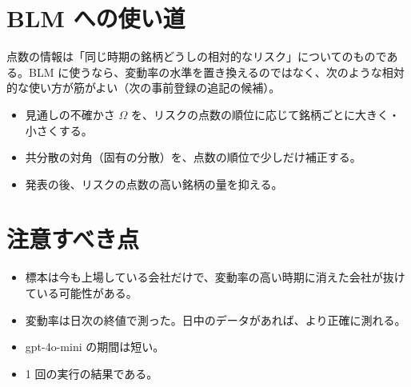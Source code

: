 \section{BLM への使い道}

点数の情報は「同じ時期の銘柄どうしの相対的なリスク」についてのものである。BLM に使うなら、変動率の水準を置き換えるのではなく、次のような相対的な使い方が筋がよい（次の事前登録の追記の候補）。

\begin{itemize}
\item 見通しの不確かさ $\Omega$ を、リスクの点数の順位に応じて銘柄ごとに大きく・小さくする。
\item 共分散の対角（固有の分散）を、点数の順位で少しだけ補正する。
\item 発表の後、リスクの点数の高い銘柄の量を抑える。
\end{itemize}

\section{注意すべき点}

\begin{itemize}
\item 標本は今も上場している会社だけで、変動率の高い時期に消えた会社が抜けている可能性がある。
\item 変動率は日次の終値で測った。日中のデータがあれば、より正確に測れる。
\item gpt-4o-mini の期間は短い。
\item 1 回の実行の結果である。
\end{itemize}
